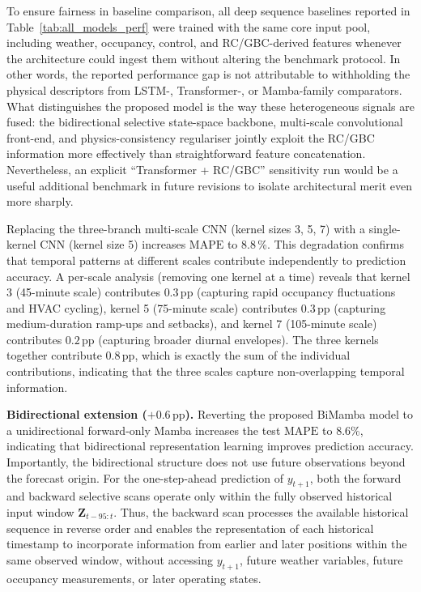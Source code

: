 \documentclass[11pt]{article}
\providecommand{\pp}{\,\text{pp}}
\providecommand{\MAPE}{\text{MAPE}}
\begin{document}
\par\noindent\hspace*{2em}To ensure fairness in baseline comparison, all deep sequence baselines reported in Table~\ref{tab:all_models_perf} were trained with the same core input pool, including weather, occupancy, control, and RC/GBC-derived features whenever the architecture could ingest them without altering the benchmark protocol. In other words, the reported performance gap is not attributable to withholding the physical descriptors from LSTM-, Transformer-, or Mamba-family comparators. What distinguishes the proposed model is the way these heterogeneous signals are fused: the bidirectional selective state-space backbone, multi-scale convolutional front-end, and physics-consistency regulariser jointly exploit the RC/GBC information more effectively than straightforward feature concatenation. Nevertheless, an explicit ``Transformer + RC/GBC'' sensitivity run would be a useful additional benchmark in future revisions to isolate architectural merit even more sharply.

\par\noindent\hspace*{2em} Replacing the three-branch multi-scale CNN (kernel sizes 3, 5, 7) with a single-kernel CNN (kernel size 5) increases $\MAPE$ to 8.8\,\%. This degradation confirms that temporal patterns at different scales contribute independently to prediction accuracy. A per-scale analysis (removing one kernel at a time) reveals that kernel 3 (45-minute scale) contributes $0.3\pp$ (capturing rapid occupancy fluctuations and HVAC cycling), kernel 5 (75-minute scale) contributes $0.3\pp$ (capturing medium-duration ramp-ups and setbacks), and kernel 7 (105-minute scale) contributes $0.2\pp$ (capturing broader diurnal envelopes). The three kernels together contribute $0.8\pp$, which is exactly the sum of the individual contributions, indicating that the three scales capture non-overlapping temporal information.

\par\noindent\hspace*{2em}\textbf{Bidirectional extension ($+0.6\pp$).} Reverting the proposed BiMamba model to a unidirectional forward-only Mamba increases the test $\MAPE$ to 8.6\%, indicating that bidirectional representation learning improves prediction accuracy. Importantly, the bidirectional structure does not use future observations beyond the forecast origin. For the one-step-ahead prediction of $y_{t+1}$, both the forward and backward selective scans operate only within the fully observed historical input window $\mathbf{Z}_{t-95:t}$. Thus, the backward scan processes the available historical sequence in reverse order and enables the representation of each historical timestamp to incorporate information from earlier and later positions within the same observed window, without accessing $y_{t+1}$, future weather variables, future occupancy measurements, or later operating states.
\end{document}
